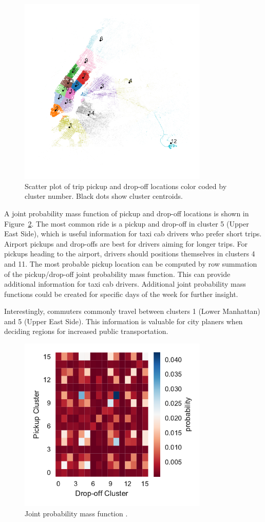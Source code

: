 \documentclass[twocolumn,10pt]{article}
\begin{document}
\begin{figure}
\centering
\includegraphics[width=90mm]{kMeansClusters}
\caption{Scatter plot of trip pickup and drop-off locations color coded by cluster number. Black dots show cluster centroids.}
\label{fig:Clusters}
\end{figure}

A joint probability mass function of pickup and drop-off locations is shown in Figure~\ref{fig:JointMassCluster}. The most common ride is a pickup and drop-off in cluster 5 (Upper East Side), which is useful information for taxi cab drivers who prefer short trips. Airport pickups and drop-offs are best for drivers aiming for longer trips. For pickups heading to the airport, drivers should positions themselves in clusters 4 and 11. The most probable pickup location can be computed by row summation of the pickup/drop-off joint probability mass function. This can provide additional information for taxi cab drivers. Additional joint probability mass functions could be created for specific days of the week for further insight. 

Interestingly, commuters commonly travel between clusters 1 (Lower Manhattan) and 5 (Upper East Side). This information is valuable for city planers when deciding regions for increased public transportation.  

\begin{figure}
\centering
\includegraphics[width=90mm]{JointMassCluster}
\caption{Joint probability mass function .}
\label{fig:JointMassCluster}
\end{figure}
\end{document}
